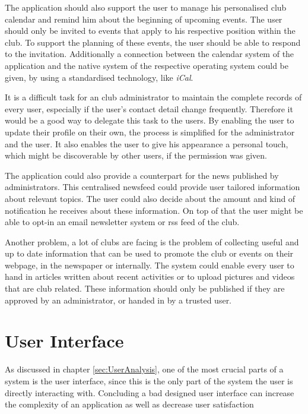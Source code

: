 The application should also support the user to manage his personalised club calendar and remind him about the beginning of upcoming events. The user should only be invited to events that apply to his respective position within the club. To support the planning of these events, the user should be able to respond to the invitation. Additionally a connection between the calendar system of the application and the native system of the respective operating system could be given, by using a standardised technology, like \emph{iCal}.

It is a difficult task for an club administrator to maintain the complete records of every user, especially if the user's contact detail change frequently. Therefore it would be a good way to delegate this task to the users. By enabling the user to update their profile on their own, the process is simplified for the administrator and the user. It also enables the user to give his appearance a personal touch, which might be discoverable by other users, if the permission was given.

The application could also provide a counterpart for the news published by administrators. This centralised newsfeed could provide user tailored information about relevant topics. The user could also decide about the amount and kind of notification he receives about these information. On top of that the user might be able to opt-in an email newsletter system or rss feed of the club.

Another problem, a lot of clubs are facing is the problem of collecting useful and up to date information that can be used to promote the club or events on their webpage, in the newspaper or internally. The system could enable every user to hand in articles written about recent activities or to upload pictures and videos that are club related. These information should only be published if they are approved by an administrator, or handed in by a trusted user.

\section{User Interface} %

As discussed in chapter \vref{sec:UserAnalysis}, one of the most crucial parts of a system is the user interface, since this is the only part of the system the user is directly interacting with. Concluding a bad designed user interface can increase the complexity of an application as well as decrease user satisfaction 


